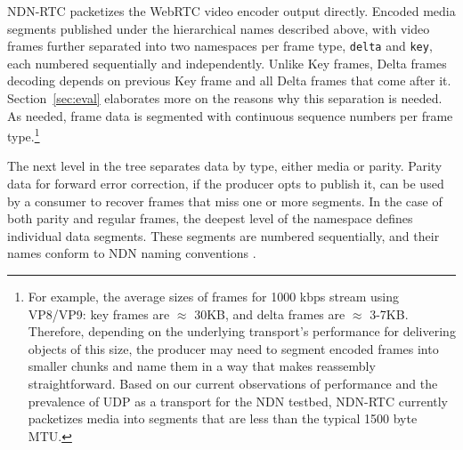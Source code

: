 \documentclass{icn/sig-alternate-2013} %
\newcommand{\ndnrtcName}{NDN-RTC} %
\begin{document}
\ndnrtcName{} packetizes the WebRTC video encoder output directly. Encoded media segments published under the hierarchical names described above, with video frames further separated into two namespaces per frame type, \texttt{delta} and \texttt{key}, each numbered sequentially and independently. Unlike Key frames, Delta frames decoding depends on previous Key frame and all Delta frames that come after it. Section~\ref{sec:eval} elaborates more on the reasons why this separation is needed. 
As needed, frame data is segmented with continuous sequence numbers per frame type.\footnote{For example, the average sizes of frames for 1000 kbps stream using VP8/VP9: key frames are $\approx$ 30KB, and delta frames are $\approx$ 3-7KB. Therefore, depending on the underlying transport's performance for delivering objects of this size, the producer may need to segment encoded frames into smaller chunks and name them in a way that makes reassembly straightforward. Based on our current observations of performance and the prevalence of UDP as a transport for the NDN testbed, \ndnrtcName{} currently packetizes media into segments that are less than the typical 1500 byte MTU.}


The next level in the tree separates data by type, either media or parity. Parity data for forward error correction, if the producer opts to publish it, can be used by a consumer to recover frames that miss one or more segments. 
In the case of both parity and regular frames, the deepest level of the namespace defines individual data segments. These segments are numbered sequentially, and their names conform to NDN naming conventions \cite{ndnnaming}.
\end{document}
